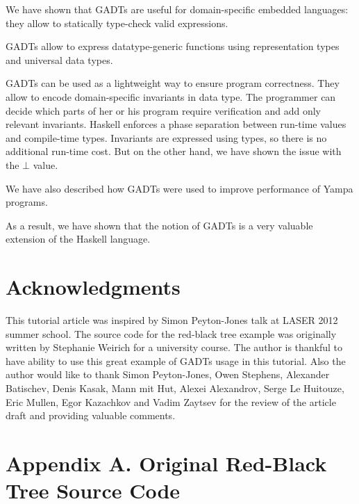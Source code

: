 \documentclass{tmr}
\begin{document}
\begin{longitem}
\item We have shown that GADTs are useful for domain-specific embedded languages: they allow to statically type-check valid expressions.
\item GADTs allow to express datatype-generic functions using representation types and universal data types.
\item GADTs can be used as a lightweight way to ensure program correctness. They allow to encode domain-specific invariants in data type. The programmer can decide which parts of her or his program require verification and add only relevant invariants. Haskell enforces a phase separation between run-time values and compile-time types. Invariants are expressed using types, so there is no additional run-time cost. But on the other hand, we have shown the issue with the $\bot$ value.
\item We have also described how GADTs were used to improve performance of Yampa programs.
\end{longitem}


As a result, we have shown that the notion of GADTs is a very valuable extension of the Haskell language.

\section*{Acknowledgments}

This tutorial article was inspired by Simon Peyton-Jones talk at LASER 2012 summer school. The source code for the red-black tree example was originally written by Stephanie Weirich for a university course. The author is thankful to have ability to use this great example of GADTs usage in this tutorial. Also the author would like to thank Simon Peyton-Jones, Owen Stephens, Alexander Batischev, Denis Kasak, Mann mit Hut, Alexei Alexandrov, Serge Le Huitouze, Eric Mullen, Egor Kazachkov and Vadim Zaytsev for the review of the article draft and providing valuable comments.



\section*{Appendix A. Original Red-Black Tree Source Code}
\label{sec:appendix_a}
\end{document}
